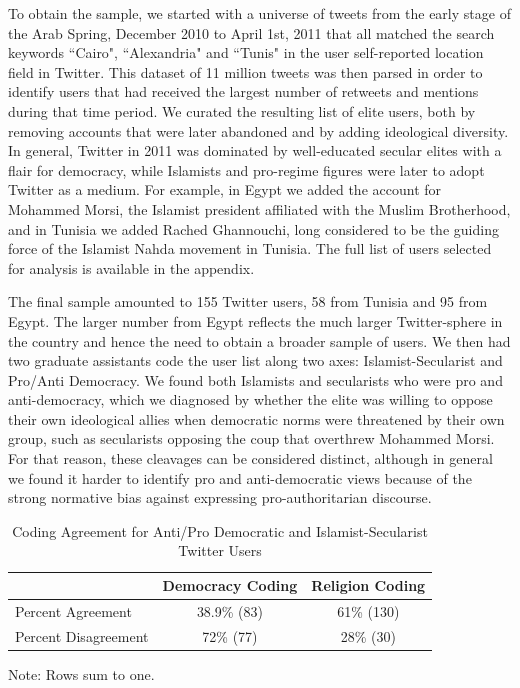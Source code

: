 \documentclass[12pt]{article}
\begin{document}
To obtain the sample, we started with a universe of tweets from the early stage of the Arab Spring, December 2010 to April 1st, 2011 that all matched the search keywords ``Cairo", ``Alexandria" and ``Tunis" in the user self-reported location field in Twitter.  This dataset of 11 million tweets was then parsed in order to identify users that had received the largest number of retweets and mentions during that time period. We curated the resulting list of elite users, both by removing accounts that were later abandoned and by adding ideological diversity. In general, Twitter in 2011 was dominated by well-educated secular elites with a flair for democracy, while Islamists and pro-regime figures were later to adopt Twitter as a medium. For example, in Egypt we added the account for Mohammed Morsi, the Islamist president affiliated with the Muslim Brotherhood, and in Tunisia we added Rached Ghannouchi, long considered to be the guiding force of the Islamist Nahda movement in Tunisia. The full list of users selected for analysis is available in the appendix.

The final sample amounted to 155 Twitter users, 58 from Tunisia and 95 from Egypt. The larger number from Egypt reflects the much larger Twitter-sphere in the country and hence the need to obtain a broader sample of users. We then had two graduate assistants code the user list along two axes: Islamist-Secularist and Pro/Anti Democracy. We found both Islamists and secularists who were pro and anti-democracy, which we diagnosed by whether the elite was willing to oppose their own ideological allies when democratic norms were threatened by their own group, such as secularists opposing the coup that overthrew Mohammed Morsi. For that reason, these cleavages can be considered distinct, although in general we found it harder to identify pro and anti-democratic views because of the strong normative bias against expressing pro-authoritarian discourse. 
\begin{table}
	\centering

	
	\begin{tabular}{l|cc}
		& Democracy Coding & Religion Coding \\
		\midrule
		Percent Agreement & 38.9\% (83) & 61\% (130) \\
		Percent Disagreement & 72\% (77) & 28\% (30) \\
	\end{tabular}

\begin{scriptsize}
	Note: Rows sum to one.
\end{scriptsize}
	\caption{Coding Agreement for Anti/Pro Democratic and Islamist-Secularist Twitter Users}\label{coding}
\end{table}
\end{document}
